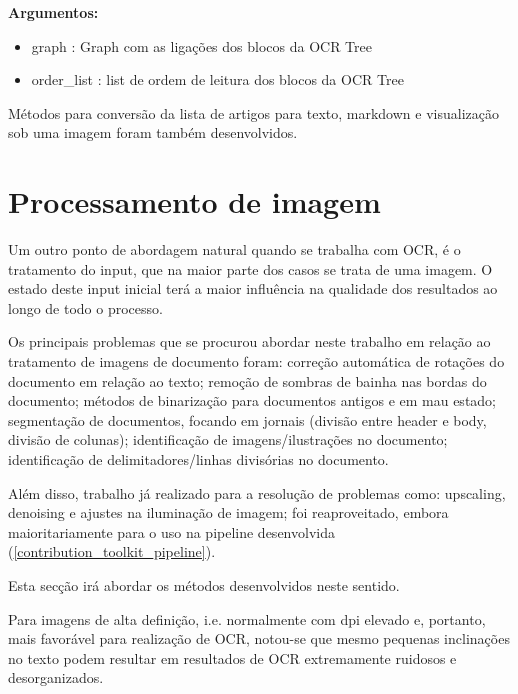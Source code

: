 \textbf{Argumentos:}
\begin{itemize}\setlength\itemsep{-0.3em}
	\item graph : Graph com as ligações dos blocos da OCR Tree
	\item order\_list : list de ordem de leitura dos blocos da OCR Tree
\end{itemize}



Métodos para conversão da lista de artigos para texto, markdown e visualização sob uma imagem foram também desenvolvidos.



\section{Processamento de imagem}
\label{contribution_image_processing}


Um outro ponto de abordagem natural quando se trabalha com OCR, é o tratamento do input, que na maior parte dos casos se trata de uma imagem. O estado deste input inicial terá a maior influência na qualidade dos resultados ao longo de todo o processo.

Os principais problemas que se procurou abordar neste trabalho em relação ao tratamento de imagens de documento foram: correção automática de rotações do documento em relação ao texto; remoção de sombras de bainha nas bordas do documento; métodos de binarização para documentos antigos e em mau estado; segmentação de documentos, focando em jornais (divisão entre header e body, divisão de colunas); identificação de imagens/ilustrações no documento; identificação de delimitadores/linhas divisórias no documento. 

Além disso, trabalho já realizado para a resolução de problemas como: upscaling, denoising e ajustes na iluminação de imagem; foi reaproveitado, embora maioritariamente para o uso na pipeline desenvolvida (\ref{contribution_toolkit_pipeline}).


Esta secção irá abordar os métodos desenvolvidos neste sentido.


\label{contribution_image_rotation_correction}

Para imagens de alta definição, i.e. normalmente com dpi elevado e, portanto, mais favorável para realização de OCR, notou-se que mesmo pequenas inclinações no texto podem resultar em resultados de OCR extremamente ruidosos e desorganizados.

